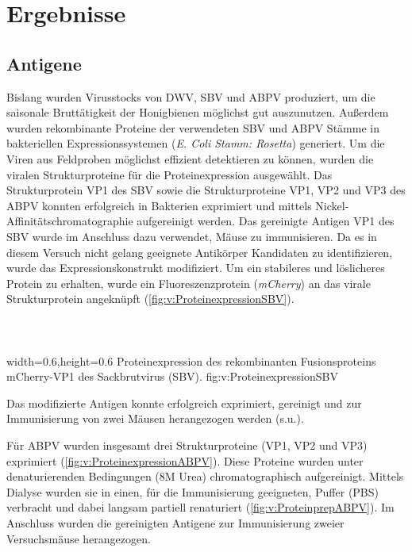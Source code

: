 \section{Ergebnisse}

\subsection{Antigene}

Bislang wurden Virusstocks von DWV, SBV und ABPV produziert, um die saisonale Bruttätigkeit der Honigbienen möglichst gut auszunutzen. Außerdem wurden rekombinante Proteine der verwendeten SBV und ABPV Stämme in bakteriellen Expressionssystemen (\textit{E. Coli Stamm: Rosetta}) generiert. Um die Viren aus Feldproben möglichst effizient detektieren zu können, wurden die viralen Strukturproteine für die Proteinexpression ausgewählt. 
Das Strukturprotein VP1 des SBV sowie die Strukturproteine VP1, VP2 und VP3 des ABPV konnten erfolgreich in Bakterien exprimiert und mittels Nickel-Affinitätschromatographie aufgereinigt werden. Das gereinigte Antigen VP1 des SBV wurde im Anschluss dazu verwendet, Mäuse zu immunisieren. Da es in diesem Versuch nicht gelang geeignete Antikörper Kandidaten zu identifizieren, wurde das Expressionskonstrukt modifiziert. Um ein stabileres und löslicheres Protein zu erhalten, wurde ein Fluoreszenzprotein (\textit{mCherry}) an das virale Strukturprotein angeknüpft (\cref{fig:v:ProteinexpressionSBV}).
\\
\\
\\
\\
{width=0.6\textwidth,height=0.6\textheight}
{Proteinexpression des rekombinanten Fusionsproteins mCherry-VP1 des Sackbrutvirus (SBV).}%
{}%
{fig:v:ProteinexpressionSBV}%

Das modifizierte Antigen konnte erfolgreich exprimiert, gereinigt und zur Immunisierung von zwei Mäusen herangezogen werden (s.u.). 

Für ABPV wurden insgesamt drei Strukturproteine (VP1, VP2 und VP3) exprimiert (\cref{fig:v:ProteinexpressionABPV}). Diese Proteine wurden unter denaturierenden Bedingungen (8M Urea) chromatographisch aufgereinigt. Mittels Dialyse wurden sie in einen, für die Immunisierung geeigneten, Puffer (PBS) verbracht und dabei langsam partiell renaturiert (\cref{fig:v:ProteinprepABPV}). Im Anschluss wurden die gereinigten Antigene zur Immunisierung zweier Versuchsmäuse herangezogen.

